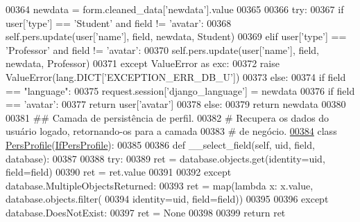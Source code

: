 \begin{DoxyCode}
00364             newdata = form.cleaned\_data[\textcolor{stringliteral}{'newdata'}].value
00365 
00366         \textcolor{keywordflow}{try}:
00367             \textcolor{keywordflow}{if} user[\textcolor{stringliteral}{'type'}] == \textcolor{stringliteral}{'Student'} \textcolor{keywordflow}{and} field != \textcolor{stringliteral}{'avatar'}:
00368                 self.pers.update(user[\textcolor{stringliteral}{'name'}], field, newdata, Student)
00369             \textcolor{keywordflow}{elif} user[\textcolor{stringliteral}{'type'}] == \textcolor{stringliteral}{'Professor'} \textcolor{keywordflow}{and} field != \textcolor{stringliteral}{'avatar'}:
00370                 self.pers.update(user[\textcolor{stringliteral}{'name'}], field, newdata, Professor)
00371         \textcolor{keywordflow}{except} ValueError \textcolor{keyword}{as} exc:
00372             \textcolor{keywordflow}{raise} ValueError(lang.DICT[\textcolor{stringliteral}{'EXCEPTION\_ERR\_DB\_U'}])
00373         \textcolor{keywordflow}{else}:
00374             \textcolor{keywordflow}{if} field == \textcolor{stringliteral}{"language"}:
00375                 request.session[\textcolor{stringliteral}{'django\_language'}] = newdata
00376         \textcolor{keywordflow}{if} field == \textcolor{stringliteral}{'avatar'}:
00377             \textcolor{keywordflow}{return} user[\textcolor{stringliteral}{'avatar'}]
00378         \textcolor{keywordflow}{else}:
00379             \textcolor{keywordflow}{return} newdata
00380 
00381 \textcolor{comment}{## Camada de persistência de perfil.}
00382 \textcolor{comment}{#   Recupera os dados do usuário logado, retornando-os para a camada}
00383 \textcolor{comment}{#   de negócio.}
\hypertarget{ProfileUnit_8py_source_l00384}{}\hyperlink{classProfile_1_1ProfileUnit_1_1PersProfile}{00384} \textcolor{keyword}{class }\hyperlink{classProfile_1_1ProfileUnit_1_1PersProfile}{PersProfile}(\hyperlink{classProfile_1_1ProfileUnit_1_1IfPersProfile}{IfPersProfile}):
00385 
00386     \textcolor{keyword}{def }\_\_select\_field(self, uid, field, database):
00387 
00388         \textcolor{keywordflow}{try}:
00389             ret = database.objects.get(identity=uid, field=field)
00390             ret = ret.value
00391 
00392         \textcolor{keywordflow}{except} database.MultipleObjectsReturned:
00393             ret = map(\textcolor{keyword}{lambda} x: x.value, database.objects.filter(
00394                     identity=uid, field=field))
00395 
00396         \textcolor{keywordflow}{except} database.DoesNotExist:
00397             ret = \textcolor{keywordtype}{None} 
00398 
00399         \textcolor{keywordflow}{return} ret

\end{DoxyCode}

